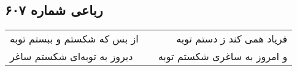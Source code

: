 \begin{center}
\section*{رباعی شماره ۶۰۷}
\label{sec:sh607}
\begin{longtable}{l p{0.5cm} r}
از بس که شکستم و ببستم توبه
&&
فریاد همی کند ز دستم توبه
\\
دیروز به توبه‌ای شکستم ساغر
&&
و امروز به ساغری شکستم توبه
\\
\end{longtable}
\end{center}
